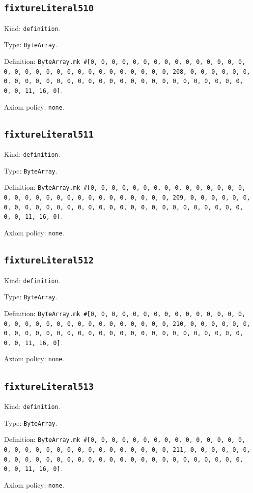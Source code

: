 \documentclass[11pt]{article}
\begin{document}
\subsection*{\texttt{fixtureLiteral510}}
\noindent Kind: \texttt{definition}.\par
\noindent Type: \texttt{ByteArray}.\par
\noindent Definition: \texttt{ByteArray.mk \#[0, 0, 0, 0, 0, 0, 0, 0, 0, 0, 0, 0, 0, 0, 0, 0, 0, 0, 0, 0, 0, 0, 0, 0, 0, 0, 0, 0, 0, 0, 0, 208, 0, 0, 0, 0, 0, 0, 0, 0, 0, 0, 0, 0, 0, 0, 0, 0, 0, 0, 0, 0, 0, 0, 0, 0, 0, 0, 0, 0, 0, 0, 0, 11, 16, 0]}.\par
\noindent Axiom policy: \texttt{none}.\par
\subsection*{\texttt{fixtureLiteral511}}
\noindent Kind: \texttt{definition}.\par
\noindent Type: \texttt{ByteArray}.\par
\noindent Definition: \texttt{ByteArray.mk \#[0, 0, 0, 0, 0, 0, 0, 0, 0, 0, 0, 0, 0, 0, 0, 0, 0, 0, 0, 0, 0, 0, 0, 0, 0, 0, 0, 0, 0, 0, 0, 209, 0, 0, 0, 0, 0, 0, 0, 0, 0, 0, 0, 0, 0, 0, 0, 0, 0, 0, 0, 0, 0, 0, 0, 0, 0, 0, 0, 0, 0, 0, 0, 11, 16, 0]}.\par
\noindent Axiom policy: \texttt{none}.\par
\subsection*{\texttt{fixtureLiteral512}}
\noindent Kind: \texttt{definition}.\par
\noindent Type: \texttt{ByteArray}.\par
\noindent Definition: \texttt{ByteArray.mk \#[0, 0, 0, 0, 0, 0, 0, 0, 0, 0, 0, 0, 0, 0, 0, 0, 0, 0, 0, 0, 0, 0, 0, 0, 0, 0, 0, 0, 0, 0, 0, 210, 0, 0, 0, 0, 0, 0, 0, 0, 0, 0, 0, 0, 0, 0, 0, 0, 0, 0, 0, 0, 0, 0, 0, 0, 0, 0, 0, 0, 0, 0, 0, 11, 16, 0]}.\par
\noindent Axiom policy: \texttt{none}.\par
\subsection*{\texttt{fixtureLiteral513}}
\noindent Kind: \texttt{definition}.\par
\noindent Type: \texttt{ByteArray}.\par
\noindent Definition: \texttt{ByteArray.mk \#[0, 0, 0, 0, 0, 0, 0, 0, 0, 0, 0, 0, 0, 0, 0, 0, 0, 0, 0, 0, 0, 0, 0, 0, 0, 0, 0, 0, 0, 0, 0, 211, 0, 0, 0, 0, 0, 0, 0, 0, 0, 0, 0, 0, 0, 0, 0, 0, 0, 0, 0, 0, 0, 0, 0, 0, 0, 0, 0, 0, 0, 0, 0, 11, 16, 0]}.\par
\noindent Axiom policy: \texttt{none}.\par
\end{document}
